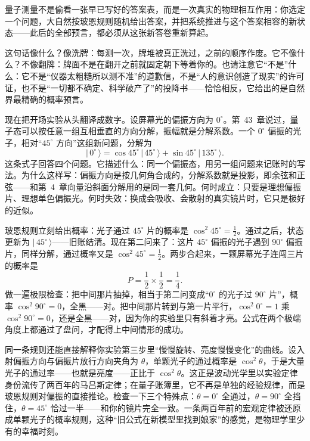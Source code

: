 
\begin{oneline}
量子测量不是偷看一张早已写好的答案表，而是一次真实的物理相互作用：你选定一个问题，大自然按玻恩规则随机给出答案，并把系统推进与这个答案相容的新状态——此后的全部预言，都必须从这张新答卷重新算起。
\end{oneline}

这句话像什么？像洗牌：每测一次，牌堆被真正洗过，之前的顺序作废。它不像什么？不像翻牌：牌面不是在翻开之前就固定朝下等着你的。也请注意它“不是”什么：它不是“仪器太粗糙所以测不准”的道歉信，不是“人的意识创造了现实”的许可证，也不是“一切都不确定、科学破产了”的投降书——恰恰相反，它给出的是自然界最精确的概率预言。


现在把开场实验从头翻译成数字。设屏幕光的偏振方向为 $0^\circ$。第~43~章说过，量子态可以按任意一组互相垂直的方向分解，振幅就是分解系数。一个 $0^\circ$ 偏振的光子，相对“$45^\circ$ 方向”这组新问题，分解为
\[
|\,0^\circ\,\rangle=\cos 45^\circ\,|\,45^\circ\,\rangle+\sin 45^\circ\,|\,135^\circ\,\rangle .
\]
这条式子回答四个问题。它描述什么：同一个偏振态，用另一组问题来记账时的写法。为什么这样写：偏振方向是按几何角合成的，分解系数就是投影，即余弦和正弦——和第~4~章向量沿斜面分解用的是同一套几何。何时成立：只要是理想偏振片、理想单色偏振光。何时失效：换成会吸收、会散射的真实镜片时，它只是极好的近似。

玻恩规则立刻给出概率：光子通过 $45^\circ$ 片的概率是 $\cos^2 45^\circ=\tfrac12$。通过之后，状态更新为 $|\,45^\circ\,\rangle$——旧账结清。现在第二问来了：这片 $45^\circ$ 偏振的光子遇到 $90^\circ$ 偏振片，同样分解，通过概率又是 $\cos^2 45^\circ=\tfrac12$。两步合起来，一颗屏幕光子连闯三片的概率是
\[
P=\frac12\times\frac12=\frac14 .
\]
做一遍极限检查：把中间那片抽掉，相当于第二问变成“$0^\circ$ 的光子过 $90^\circ$ 片”，概率 $\cos^2 90^\circ=0$，全黑——对。把中间那片转到与第一片平行，$\cos^2 0^\circ=1$ 乘 $\cos^2 90^\circ=0$，还是全黑——对，因为你的实验里只有斜着才亮。公式在两个极端角度上都通过了盘问，才配得上中间情形的成功。

同一条规则还能直接解释你实验第三步里“慢慢旋转、亮度慢慢变化”的曲线。设入射偏振方向与偏振片放行方向夹角为 $\theta$，单颗光子的通过概率是 $\cos^2\theta$，于是大量光子的通过率——也就是亮度——正比于 $\cos^2\theta$。这正是波动光学里以实验定律身份流传了两百年的马吕斯定律；在量子账簿里，它不再是单独的经验规律，而是玻恩规则对偏振的直接推论。检查一下三个特殊点：$\theta=0^\circ$ 全通过，$\theta=90^\circ$ 全挡住，$\theta=45^\circ$ 恰过一半——和你的镜片完全一致。一条两百年前的宏观定律被还原成单颗光子的概率规则，这种“旧公式在新模型里找到娘家”的感觉，是物理学里少有的幸福时刻。

